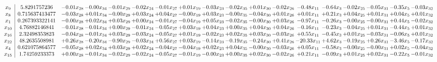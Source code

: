 \documentclass[9pt]{article}
\begin{document}
 \[\begin{array}{c| c c@{\hskip 2pt} c@{\hskip 2pt} c@{\hskip 2pt} c@{\hskip 2pt} c@{\hskip 2pt} c@{\hskip 2pt} c@{\hskip 2pt} c@{\hskip 2pt} c@{\hskip 2pt} c@{\hskip 2pt} c@{\hskip 2pt} c@{\hskip 2pt} c@{\hskip 2pt} c@{\hskip 2pt} c@{\hskip 2pt} c@{\hskip 2pt} }
 x_{9}   &  5.8291757236 & -0.01 x_{28} & -0.00 x_{34} & -0.01 x_{29} & -0.02 x_{24} & -0.01 x_{27} & +  0.01 x_{19} & -0.03 x_{23} & -0.02 x_{35} & +  0.01 x_{30} & -0.02 x_{26} & -0.48 x_{11} & -0.64 x_{3} & -0.02 x_{25} & -0.05 x_{31} & -0.35 x_{5} & -0.03 x_{32}\\
 x_{8}   &  0.715637413477 & -0.03 x_{28} & +  0.01 x_{34} & -0.00 x_{29} & +  0.03 x_{24} & +  0.04 x_{27} & -0.00 x_{19} & +  0.03 x_{23} & -0.00 x_{35} & -0.04 x_{30} & +  0.01 x_{26} & +  0.01 x_{11} & +  0.21 x_{3} & +  0.04 x_{25} & +  0.01 x_{31} & +  0.04 x_{5} & +  0.01 x_{32}\\
 x_{1}   &  0.267393322141 & -0.00 x_{28} & +  0.02 x_{34} & +  0.03 x_{29} & +  0.00 x_{24} & -0.01 x_{27} & -0.04 x_{19} & +  0.05 x_{23} & -0.02 x_{35} & -0.00 x_{30} & +  0.03 x_{26} & -0.97 x_{11} & -0.26 x_{3} & -0.00 x_{25} & -0.00 x_{31} & +  0.44 x_{5} & -0.02 x_{32}\\
 x_{10}   &  4.76882146841 & -0.01 x_{28} & -0.01 x_{34} & +  0.00 x_{29} & -0.01 x_{24} & -0.05 x_{27} & +  0.03 x_{19} & +  0.04 x_{23} & +  0.00 x_{35} & +  0.04 x_{30} & +  0.04 x_{26} & -0.16 x_{11} & -0.23 x_{3} & -0.04 x_{25} & +  0.01 x_{31} & -0.44 x_{5} & +  0.01 x_{32}\\
 x_{16}   &  2.32498353823 & -0.04 x_{28} & -0.01 x_{34} & +  0.03 x_{29} & -0.03 x_{24} & -0.05 x_{27} & +  0.01 x_{19} & -0.02 x_{23} & +  0.02 x_{35} & +  0.03 x_{30} & -0.03 x_{26} & +  0.55 x_{11} & -0.45 x_{3} & +  0.01 x_{25} & -0.03 x_{31} & -0.06 x_{5} & +  0.01 x_{32}\\
 x_{22}   &  48.2635508981 & +  0.26 x_{28} & -0.20 x_{34} & -0.90 x_{29} & -0.03 x_{24} & +  0.56 x_{27} & +  0.03 x_{19} & -0.14 x_{23} & -0.19 x_{35} & -0.24 x_{30} & +  0.41 x_{26} & -20.33 x_{11} & +  4.62 x_{3} & -0.19 x_{25} & +  0.26 x_{31} & -3.46 x_{5} & -0.17 x_{32}\\
 x_{4}   &  0.621075864577 & -0.05 x_{28} & +  0.02 x_{34} & +  0.03 x_{29} & +  0.02 x_{24} & -0.04 x_{27} & -0.04 x_{19} & +  0.02 x_{23} & +  0.04 x_{35} & -0.00 x_{30} & -0.03 x_{26} & +  0.05 x_{11} & -0.58 x_{3} & -0.00 x_{25} & -0.00 x_{31} & +  0.02 x_{5} & -0.04 x_{32}\\
 x_{15}   &  1.74259233373 & +  0.00 x_{28} & -0.01 x_{34} & -0.02 x_{29} & -0.02 x_{24} & -0.05 x_{27} & -0.01 x_{19} & -0.00 x_{23} & +  0.00 x_{35} & +  0.02 x_{30} & -0.02 x_{26} & +  0.21 x_{11} & -0.09 x_{3} & +  0.01 x_{25} & +  0.02 x_{31} & -0.22 x_{5} & -0.01 x_{32}\\

\end{array}\]
\end{document}
